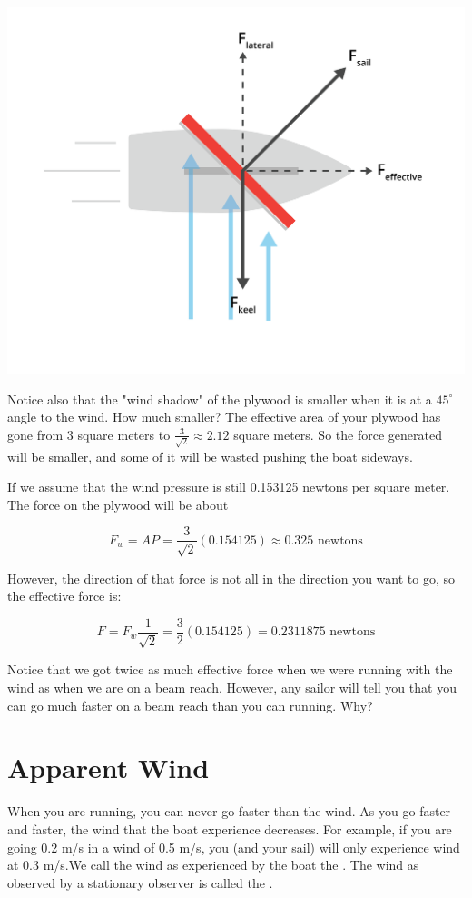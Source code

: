 \includegraphics[width=.75\textwidth]{pressure2.png}


Notice also that the "wind shadow" of the plywood is smaller when it is at a $45^\circ$ angle to the wind.  How much smaller?  The effective area of your plywood has 
gone from 3 square meters to $\frac{3}{\sqrt{2}} \approx 2.12$ square meters.   So the force generated will be smaller, and some of it will be wasted pushing the boat sideways.

If we assume that the wind pressure is still 0.153125 newtons per square meter.  The force on the plywood will be about

$$F_w = A P = \frac{3}{\sqrt{2}}(0.154125) \approx 0.325 \text{ newtons}$$

However,   the direction of that force is not all in the direction you want to go,  so the effective force is:

$$F = F_w \frac{1}{\sqrt{2}} =  \frac{3}{2}(0.154125) = 0.2311875 \text{ newtons}$$

Notice that we got twice as much effective force when we were running with the wind as when we are on a beam reach.   However,  any sailor will tell you that you can go much faster
on a beam reach than you can running.  Why?

\section{Apparent Wind}

When you are running,  you can never go faster than the wind.   As you go faster and faster,  the wind that the boat experience decreases.   For example,  if you are going 0.2 m/s in a wind 
of 0.5 m/s,  you (and your sail) will only experience wind at 0.3 m/s.We call the wind as experienced by the boat 
the .  The wind as observed by a stationary observer is called the .


